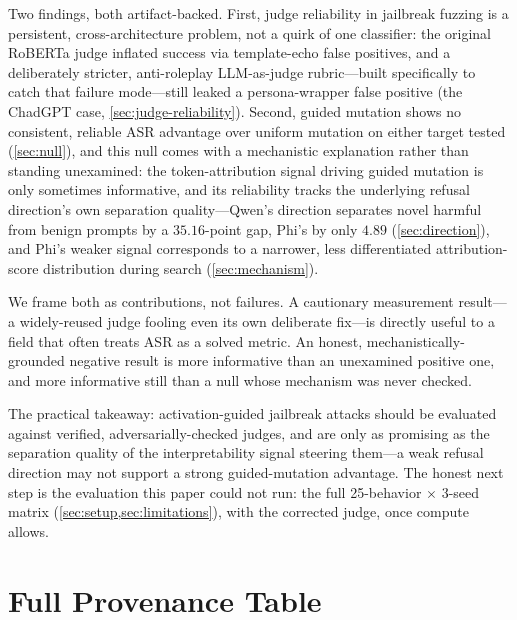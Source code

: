 \documentclass[11pt,letterpaper]{article}
\begin{document}
Two findings, both artifact-backed. First, judge reliability in jailbreak fuzzing is a
persistent, cross-architecture problem, not a quirk of one classifier: the original RoBERTa judge
inflated success via template-echo false positives, and a deliberately stricter, anti-roleplay
LLM-as-judge rubric---built specifically to catch that failure mode---still leaked a
persona-wrapper false positive (the ChadGPT case, \cref{sec:judge-reliability}). Second, guided
mutation shows no consistent, reliable ASR advantage over uniform mutation on either target
tested (\cref{sec:null}), and this null comes with a mechanistic explanation rather than standing
unexamined: the token-attribution signal driving guided mutation is only sometimes informative,
and its reliability tracks the underlying refusal direction's own separation quality---Qwen's
direction separates novel harmful from benign prompts by a $35.16$-point gap, Phi's by only
$4.89$ (\cref{sec:direction}), and Phi's weaker signal corresponds to a narrower, less
differentiated attribution-score distribution during search (\cref{sec:mechanism}).

We frame both as contributions, not failures. A cautionary measurement result---a widely-reused
judge fooling even its own deliberate fix---is directly useful to a field that often treats ASR
as a solved metric. An honest, mechanistically-grounded negative result is more informative than
an unexamined positive one, and more informative still than a null whose mechanism was never
checked.

The practical takeaway: activation-guided jailbreak attacks should be evaluated against verified,
adversarially-checked judges, and are only as promising as the separation quality of the
interpretability signal steering them---a weak refusal direction may not support a strong
guided-mutation advantage. The honest next step is the evaluation this paper could not run: the
full 25-behavior $\times$ 3-seed matrix (\cref{sec:setup,sec:limitations}), with the corrected
judge, once compute allows.

\printbibliography


\appendix
\section{Full Provenance Table}
\label{app:provenance}
\end{document}
